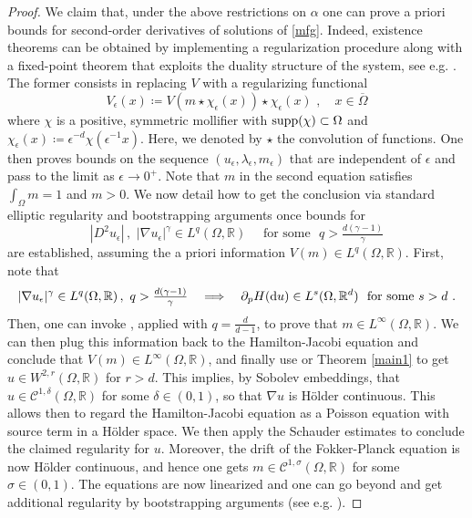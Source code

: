 \documentclass[10pt, a4paper, reqno, oneside]{amsart}
\theoremstyle{plain}
\theoremstyle{definition}
\theoremstyle{plain}
\theoremstyle{definition}
\theoremstyle{plain}
\renewcommand{\=}{:=}
\begin{document}
\begin{proof}
We claim that, under the above restrictions on $\alpha$ one can prove a priori bounds for second-order derivatives of solutions of \eqref{mfg}. Indeed, existence theorems can be obtained by implementing a regularization procedure along with a fixed-point theorem that exploits the duality structure of the system, see e.g. \cite[Theorems 4 and 7]{CirantJMPA}. The former consists in replacing $V$ with a regularizing functional
$$
V_\epsilon(x) \coloneqq V(m\star \chi_\epsilon(x)) \star \chi_\epsilon(x) \,\, , \quad x \in \overline{\Omega}
$$
where $\chi$ is a positive, symmetric mollifier with ${\rm supp}(\chi) \subset \Omega$ and $\chi_{\epsilon}(x) \coloneqq \epsilon^{-d}\chi(\epsilon^{-1}x)$. Here, we denoted by $\star$ the convolution of functions. One then proves bounds on the sequence $(u_\epsilon,\lambda_\epsilon,m_\epsilon)$ that are independent of $\epsilon$ and pass to the limit as $\epsilon \to 0^+$. Note that $m$ in the second equation satisfies $\int_\Omega m=1$ and $m>0$. We now detail how to get the conclusion via standard elliptic regularity and bootstrapping arguments once bounds for
$$
|D^2u_\epsilon| \, , \,\, |\nabla u_\epsilon|^\gamma \in L^q(\Omega,\mathbb{R}) \quad \text{ for some } \,\, q>\tfrac{d(\gamma-1)}{\gamma}
$$
are established, assuming the a priori information $V(m)\in L^q(\Omega,\mathbb{R})$. First, note that
$$
|\nabla u_\epsilon|^\gamma \in L^q(\Omega,\mathbb{R}) \, , \,\, q>\tfrac{d(\gamma-1)}{\gamma} \quad \Longrightarrow \quad
\partial_pH({\rm d}u) \in L^s(\Omega,\mathbb{R}^d) \,\, \text{ for some } s>d \,\, .
$$
Then, one can invoke \cite[Proposition 12]{CirantJMPA}, applied with $q=\frac{d}{d-1}$, to prove that $m \in L^{\infty}(\Omega,\mathbb{R})$. We can then plug this information back to the Hamilton-Jacobi equation and conclude that $V(m) \in L^{\infty}(\Omega,\mathbb{R})$, and finally use \cite[Theorem 19]{CirantJMPA} or Theorem \ref{main1} to get $u \in W^{2,r}(\Omega,\mathbb{R})$ for $r>d$. This implies, by Sobolev embeddings, that $u\in \mathcal{C}^{1,\delta}(\Omega,\mathbb{R})$ for some $\delta\in(0,1)$, so that $\nabla u$ is H\"older continuous. This allows then to regard the Hamilton-Jacobi equation as a Poisson equation with source term in a H\"older space. We then apply the Schauder estimates to conclude the claimed regularity for $u$. Moreover, the drift of the Fokker-Planck equation is now H\"older continuous, and hence one gets $m \in \mathcal{C}^{1,\sigma}(\Omega,\mathbb{R})$ for some $\sigma\in(0,1)$. The equations are now linearized and one can go beyond and get additional regularity by bootstrapping arguments (see e.g. \cite[Step 5 in Theorem 7]{CirantJMPA}).


\end{proof}
\end{document}
